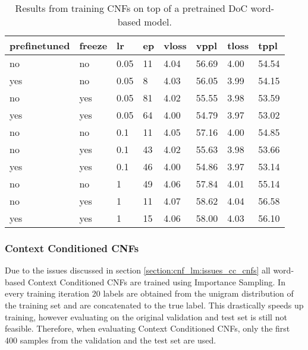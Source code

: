 \begin{table}[]
\centering
\caption{Results from training CNFs on top of a pretrained DoC word-based model.}
\begin{tabular}{|l|l|l|l|l|l|l|l|}
\hline
\textbf{prefinetuned} & \textbf{freeze} & \textbf{lr} & \textbf{ep} & \textbf{vloss} & \textbf{vppl} & \textbf{tloss} & \textbf{tppl} \\ \hline
no           & no     & 0.05 & 11 & 4.04  & 56.69 & 4.00  & 54.54 \\ \hline
yes          & no     & 0.05 & 8  & 4.03  & 56.05 & 3.99  & 54.15 \\ \hline
no           & yes    & 0.05 & 81 & 4.02  & 55.55 & 3.98  & 53.59 \\ \hline
yes          & yes    & 0.05 & 64 & 4.00  & 54.79 & 3.97  & 53.02 \\ \hline
no           & no     & 0.1  & 11 & 4.05  & 57.16 & 4.00  & 54.85 \\ \hline
no           & yes    & 0.1  & 43 & 4.02  & 55.63 & 3.98  & 53.66 \\ \hline
yes          & yes    & 0.1  & 46 & 4.00  & 54.86 & 3.97  & 53.14 \\ \hline
no           & no     & 1    & 49 & 4.06  & 57.84 & 4.01  & 55.14 \\ \hline
no           & yes    & 1    & 11 & 4.07  & 58.62 & 4.04  & 56.58 \\ \hline
yes          & yes    & 1    & 15 & 4.06  & 58.00 & 4.03  & 56.10 \\ \hline
\end{tabular}
\end{table}


\subsubsection{Context Conditioned CNFs}

Due to the issues discussed in section \ref{section:cnf_lm:issues_cc_cnfs} all word-based Context Conditioned CNFs are trained using Importance Sampling. In every training iteration 20 labels are obtained from the unigram distribution of the training set and are concatenated to the true label. This drastically speeds up training, however evaluating on the original validation and test set is still not feasible. Therefore, when evaluating Context Conditioned CNFs, only the first 400 samples from the validation and the test set are used.


